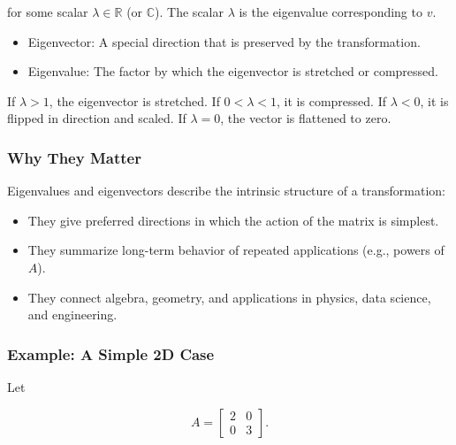 \documentclass[
  letterpaper,
  DIV=11,
  numbers=noendperiod]{scrreprt}
\providecommand{\tightlist}{%
  \setlength{\itemsep}{0pt}\setlength{\parskip}{0pt}}
\begin{document}
for some scalar \(\lambda \in \mathbb{R}\) (or \(\mathbb{C}\)). The
scalar \(\lambda\) is the eigenvalue corresponding to \(v\).

\begin{itemize}
\tightlist
\item
  Eigenvector: A special direction that is preserved by the
  transformation.
\item
  Eigenvalue: The factor by which the eigenvector is stretched or
  compressed.
\end{itemize}

If \(\lambda > 1\), the eigenvector is stretched. If
\(0 < \lambda < 1\), it is compressed. If \(\lambda < 0\), it is flipped
in direction and scaled. If \(\lambda = 0\), the vector is flattened to
zero.

\subsubsection{Why They Matter}\label{why-they-matter-1}

Eigenvalues and eigenvectors describe the intrinsic structure of a
transformation:

\begin{itemize}
\tightlist
\item
  They give preferred directions in which the action of the matrix is
  simplest.
\item
  They summarize long-term behavior of repeated applications (e.g.,
  powers of \(A\)).
\item
  They connect algebra, geometry, and applications in physics, data
  science, and engineering.
\end{itemize}

\subsubsection{Example: A Simple 2D
Case}\label{example-a-simple-2d-case}

Let

\[
A = \begin{bmatrix} 2 & 0 \\ 0 & 3 \end{bmatrix}.
\]
\end{document}
